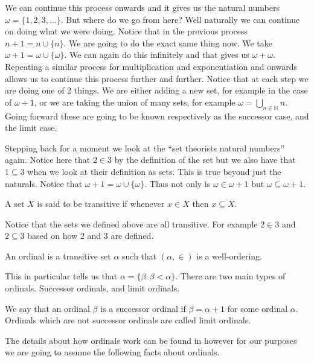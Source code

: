 We can continue this process onwards and it gives us the natural numbers
$\omega = \{1, 2, 3, \ldots\}$. But where do we go from here? Well naturally we
can continue on doing what we were doing. Notice that in the previous process
$n + 1 = n \cup \{n\}$. We are going to do the exact same thing now. We take
$\omega + 1 = \omega \cup \{\omega\}$. We can again do this infinitely and that
gives us $\omega + \omega$. Repeating a similar process for multiplication and
exponentiation and onwards allows us to continue this process further and
further. Notice that at each step we are doing one of 2 things. We are either
adding a new set, for example in the case of $\omega + 1$, or we are taking the
union of many sets, for example $\omega = \bigcup_{n \in \mathbb{N}} n$. Going
forward these are going to be known respectively as the successor case, and the
limit case. 

Stepping back for a moment we look at the ``set theorists natural numbers''
again. Notice here that $2 \in 3$ by the definition of the set but we also have
that $1 \subseteq 3$ when we look at their definition as sets. This is true
beyond just the naturals. Notice that $\omega + 1 = \omega \cup \{\omega\}$.
Thus not only is $\omega \in \omega + 1$ but $\omega \subseteq \omega + 1$.

\begin{defn}[Transitive]
  A set $X$ is said to be transitive if whenever $x \in X$ then $x \subseteq
  X$.
\end{defn}

Notice that the sets we defined above are all transitive. For example $2 \in 3$
and $2 \subseteq 3$ based on how $2$ and $3$ are defined. 

\begin{defn}[Ordinal]
  An ordinal is a transitive set $\alpha$ such that $(\alpha, \in)$ is
  a well-ordering.
\end{defn}

This in particular tells us that $\alpha = \{\beta: \beta < \alpha\}$. 
There are two main types of ordinals. Successor ordinals, and limit ordinals.

\begin{defn}
  We say that an ordinal $\beta$ is a successor ordinal if $\beta = \alpha + 1$ 
  for some ordinal $\alpha$. Ordinals which are not successor ordinals are
  called limit ordinals.
\end{defn}

The details about how ordinals work can be found in \cite{Schimmerling2011-li} however for our purposes we are going to assume the following
facts about ordinals.

